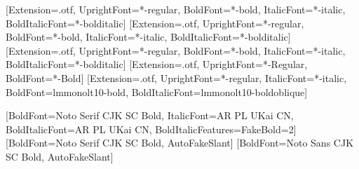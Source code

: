 \usepackage[UTF8,scheme=plain,fontset=none]{ctex}


\ifdefined\ZhouyiRm
  \setmainfont{texgyretermes}[Extension=.otf, UprightFont=*-regular, BoldFont=*-bold,
    ItalicFont=*-italic, BoldItalicFont=*-bolditalic]
\fi
\ifdefined\ZhouyiSf
  \setsansfont{texgyreheros}[Extension=.otf, UprightFont=*-regular, BoldFont=*-bold,
    ItalicFont=*-italic, BoldItalicFont=*-bolditalic]
\fi
\ifdefined\ZhouyiTt
  \setmonofont{texgyrecursor}[Extension=.otf, UprightFont=*-regular, BoldFont=*-bold,
    ItalicFont=*-italic, BoldItalicFont=*-bolditalic]
\fi
\ifdefined\ZhouyiTtinconsolata
  \setmonofont{Inconsolatazi4}[Extension=.otf, UprightFont=*-Regular, BoldFont=*-Bold]
\fi
\ifdefined\ZhouyiTtlmmono
  \setmonofont{lmmono10}[Extension=.otf, UprightFont=*-regular, ItalicFont=*-italic,
    BoldFont=lmmonolt10-bold, BoldItalicFont=lmmonolt10-boldoblique]
\fi

  {[BoldFont=Noto Serif CJK SC Bold,
     ItalicFont=AR PL UKai CN, BoldItalicFont=AR PL UKai CN, BoldItalicFeatures={FakeBold=2}]}
  {[BoldFont=Noto Serif CJK SC Bold, AutoFakeSlant]}
[BoldFont=Noto Sans CJK SC Bold, AutoFakeSlant]


